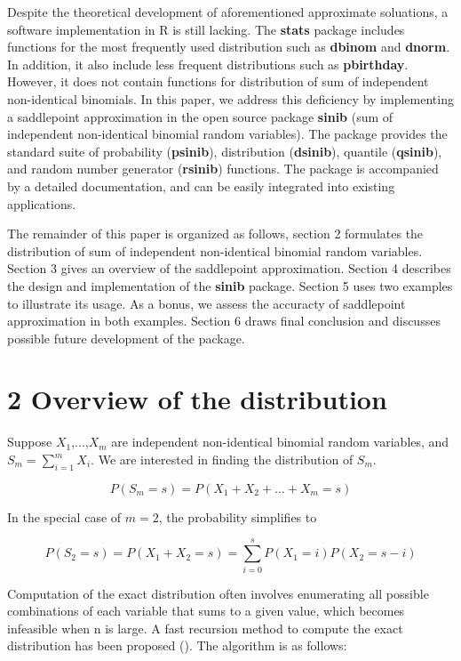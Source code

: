 Despite the theoretical development of aforementioned approximate soluations, a software implementation in R is still lacking. The \textbf{stats} package includes functions for the most frequently used distribution such as \textbf{dbinom} and \textbf{dnorm}. In addition, it also include less frequent distributions such as \textbf{pbirthday}. However, it does not contain functions for distribution of sum of independent non-identical binomials. In this paper, we address this deficiency by implementing a saddlepoint approximation in the open source package \textbf{sinib} (sum of independent non-identical binomial random variables). The package provides the standard suite of probability (\textbf{psinib}), distribution (\textbf{dsinib}), quantile (\textbf{qsinib}), and random number generator (\textbf{rsinib}) functions. The package is accompanied by a detailed documentation, and can be easily integrated into existing applications.

The remainder of this paper is organized as follows, section 2 formulates the distribution of sum of independent non-identical binomial random variables. Section 3 gives an overview of the saddlepoint approximation. Section 4 describes the design and implementation of the \textbf{sinib} package. Section 5 uses two examples to illustrate its usage. As a bonus, we assess the accuracty of saddlepoint approximation in both examples. Section 6 draws final conclusion and discusses possible future development of the package. 

\section{2 Overview of the distribution}


Suppose $X_1$,...,$X_m$ are independent non-identical binomial random variables, and $S_m = \sum_{i=1}^{m} X_i$. We are interested in finding the distribution of $S_m$. 

\begin{equation}
P(S_m = s) = P(X_1+X_2+...+X_m = s)
\end{equation}

In the special case of $m = 2$, the probability simplifies to 

\begin{equation}
P(S_2=s) = P(X_1+X_2=s) = \sum_{i=0}^s P(X_1=i) P(X_2=s-i)
\label{eq:2}
\end{equation}

Computation of the exact distribution often involves enumerating all possible combinations of each variable that sums to a given value, which becomes infeasible when n is large. A fast recursion method to compute the exact distribution has been proposed (\cite{Butler:2016cj,ArthurWoodward:1997en}). The algorithm is as follows: 

